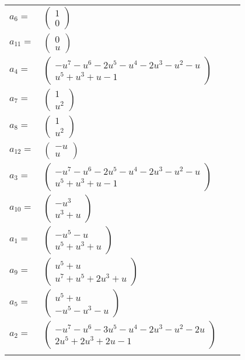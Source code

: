 \documentclass[1p]{elsarticle_modified}
\theoremstyle{definition}
\begin{document}
\begin{tabular}{m{7pt} m{180pt} m{7pt} m{180pt} }
\flushright $a_{6}=$&$\begin{pmatrix}1\\0\end{pmatrix}$ \\
\flushright $a_{11}=$&$\begin{pmatrix}0\\u\end{pmatrix}$ \\
\flushright $a_{4}=$&$\begin{pmatrix}- u^7- u^6-2 u^5- u^4-2 u^3- u^2- u\\u^5+u^3+u-1\end{pmatrix}$ \\
\flushright $a_{7}=$&$\begin{pmatrix}1\\u^2\end{pmatrix}$ \\
\flushright $a_{8}=$&$\begin{pmatrix}1\\u^2\end{pmatrix}$ \\
\flushright $a_{12}=$&$\begin{pmatrix}- u\\u\end{pmatrix}$ \\
\flushright $a_{3}=$&$\begin{pmatrix}- u^7- u^6-2 u^5- u^4-2 u^3- u^2- u\\u^5+u^3+u-1\end{pmatrix}$ \\
\flushright $a_{10}=$&$\begin{pmatrix}- u^3\\u^3+u\end{pmatrix}$ \\
\flushright $a_{1}=$&$\begin{pmatrix}- u^5- u\\u^5+u^3+u\end{pmatrix}$ \\
\flushright $a_{9}=$&$\begin{pmatrix}u^5+u\\u^7+u^5+2 u^3+u\end{pmatrix}$ \\
\flushright $a_{5}=$&$\begin{pmatrix}u^5+u\\- u^5- u^3- u\end{pmatrix}$ \\
\flushright $a_{2}=$&$\begin{pmatrix}- u^7- u^6-3 u^5- u^4-2 u^3- u^2-2 u\\2 u^5+2 u^3+2 u-1\end{pmatrix}$\\&\end{tabular}
\end{document}
